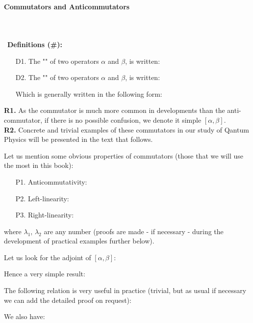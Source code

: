 	\paragraph{Commutators and Anticommutators}\label{commutators and anticommutators}\mbox{}\\\\\
	\textbf{Definitions (\#\mydef):}
	\begin{itemize}
		\item[D1.] The "" of two operators $\alpha$ and $\beta$, is written:
		
		\item[D2.] The "" of two operators $\alpha$ and $\beta$, is written:
		
		Which is generally written in the following form:
		
	\end{itemize}
	\begin{tcolorbox}[title=Remarks,colframe=black,arc=10pt]
	\textbf{R1.} As the commutator is much more common in developments than the anti-commutator, if there is no possible confusion, we denote it simple $[\alpha,\beta]$.\\
	
	\textbf{R2.} Concrete and trivial examples of these commutators in our study of Qantum Physics will be presented in the text that follows.
	\end{tcolorbox}
	Let us mention some obvious properties of commutators (those that we will use the most in this book):
	\begin{enumerate}
		\item[P1.] Anticommutativity:
		

		\item[P2.] Left-linearity:
		

		\item[P3.] Right-linearity:
		
	\end{enumerate}
	where $\lambda_1$, $\lambda_2$ are any number (proofs are made - if necessary - during the development of practical examples further below).
	
	Let us look for the adjoint of $[\alpha,\beta]$:
	
	Hence a very simple result:
	
	The following relation is very useful in practice (trivial, but as usual if necessary we can add the detailed proof on request):
	
	We also have:
	
